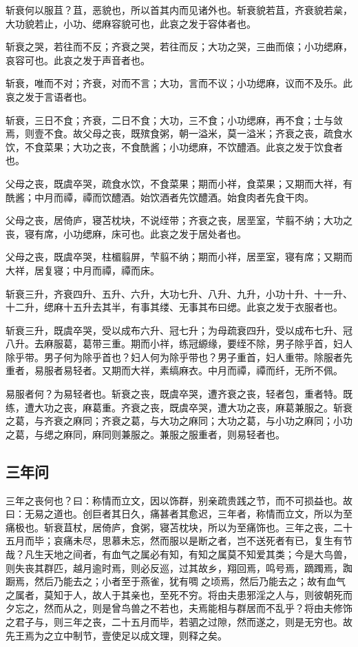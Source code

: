 \documentclass[]{article}
\begin{document}
斩衰何以服苴？苴，恶貌也，所以首其内而见诸外也。斩衰貌若苴，齐衰貌若枲，大功貌若止，小功、缌麻容貌可也，此哀之发于容体者也。

斩衰之哭，若往而不反；齐衰之哭，若往而反；大功之哭，三曲而偯；小功缌麻，哀容可也。此哀之发于声音者也。

斩衰，唯而不对；齐衰，对而不言；大功，言而不议；小功缌麻，议而不及乐。此哀之发于言语者也。

斩衰，三日不食；齐衰，二日不食；大功，三不食；小功缌麻，再不食；士与敛焉，则壹不食。故父母之丧，既殡食粥，朝一溢米，莫一溢米；齐衰之丧，疏食水饮，不食菜果；大功之丧，不食酰酱；小功缌麻，不饮醴酒。此哀之发于饮食者也。

父母之丧，既虞卒哭，疏食水饮，不食菜果；期而小祥，食菜果；又期而大祥，有酰酱；中月而禫，禫而饮醴酒。始饮酒者先饮醴酒。始食肉者先食干肉。

父母之丧，居倚庐，寝苫枕块，不说绖带；齐衰之丧，居垩室，芐翦不纳；大功之丧，寝有席，小功缌麻，床可也。此哀之发于居处者也。

父母之丧，既虞卒哭，柱楣翦屏，芐翦不纳；期而小祥，居垩室，寝有席；又期而大祥，居复寝；中月而禫，禫而床。

斩衰三升，齐衰四升、五升、六升，大功七升、八升、九升，小功十升、十一升、十二升，缌麻十五升去其半，有事其缕、无事其布曰缌。此哀之发于衣服者也。

斩衰三升，既虞卒哭，受以成布六升、冠七升；为母疏衰四升，受以成布七升、冠八升。去麻服葛，葛带三重。期而小祥，练冠縓缘，要绖不除，男子除乎首，妇人除乎带。男子何为除乎首也？妇人何为除乎带也？男子重首，妇人重带。除服者先重者，易服者易轻者。又期而大祥，素缟麻衣。中月而禫，禫而纤，无所不佩。

易服者何？为易轻者也。斩衰之丧，既虞卒哭，遭齐衰之丧，轻者包，重者特。既练，遭大功之丧，麻葛重。齐衰之丧，既虞卒哭，遭大功之丧，麻葛兼服之。斩衰之葛，与齐衰之麻同；齐衰之葛，与大功之麻同；大功之葛，与小功之麻同；小功之葛，与缌之麻同，麻同则兼服之。兼服之服重者，则易轻者也。

\hypertarget{header-n818}{%
\subsection{三年问}\label{header-n818}}

三年之丧何也？曰：称情而立文，因以饰群，别亲疏贵践之节，而不可损益也。故曰：无易之道也。创巨者其日久，痛甚者其愈迟，三年者，称情而立文，所以为至痛极也。斩衰苴杖，居倚庐，食粥，寝苫枕块，所以为至痛饰也。三年之丧，二十五月而毕；哀痛未尽，思慕未忘，然而服以是断之者，岂不送死者有已，复生有节哉？凡生天地之间者，有血气之属必有知，有知之属莫不知爱其类；今是大鸟兽，则失丧其群匹，越月逾时焉，则必反巡，过其故乡，翔回焉，鸣号焉，蹢躅焉，踟蹰焉，然后乃能去之；小者至于燕雀，犹有啁之顷焉，然后乃能去之；故有血气之属者，莫知于人，故人于其亲也，至死不穷。将由夫患邪淫之人与，则彼朝死而夕忘之，然而从之，则是曾鸟兽之不若也，夫焉能相与群居而不乱乎？将由夫修饰之君子与，则三年之丧，二十五月而毕，若驷之过隙，然而遂之，则是无穷也。故先王焉为之立中制节，壹使足以成文理，则释之矣。
\end{document}
